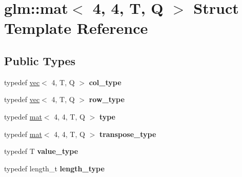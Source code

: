 \hypertarget{structglm_1_1mat_3_014_00_014_00_01T_00_01Q_01_4}{}\section{glm\+:\+:mat$<$ 4, 4, T, Q $>$ Struct Template Reference}
\label{structglm_1_1mat_3_014_00_014_00_01T_00_01Q_01_4}
\subsection*{Public Types}
\begin{DoxyCompactItemize}
\item 
\mbox{\label{structglm_1_1mat_3_014_00_014_00_01T_00_01Q_01_4_aad430dc291d0156d573c434be7fdecc1}} 
typedef \hyperlink{structglm_1_1vec}{vec}$<$ 4, T, Q $>$ {\bfseries col\+\_\+type}
\item 
\mbox{\label{structglm_1_1mat_3_014_00_014_00_01T_00_01Q_01_4_a2f05ded6544c98508d5f29e498d2e4dd}} 
typedef \hyperlink{structglm_1_1vec}{vec}$<$ 4, T, Q $>$ {\bfseries row\+\_\+type}
\item 
\mbox{\label{structglm_1_1mat_3_014_00_014_00_01T_00_01Q_01_4_a2151b2f14fc2ccf6e39a0ca3182270c2}} 
typedef \hyperlink{structglm_1_1mat}{mat}$<$ 4, 4, T, Q $>$ {\bfseries type}
\item 
\mbox{\label{structglm_1_1mat_3_014_00_014_00_01T_00_01Q_01_4_aae643ca23a5e538e908086e5149f500f}} 
typedef \hyperlink{structglm_1_1mat}{mat}$<$ 4, 4, T, Q $>$ {\bfseries transpose\+\_\+type}
\item 
\mbox{\label{structglm_1_1mat_3_014_00_014_00_01T_00_01Q_01_4_ae564877d4d3802415244ba1c83cc4c89}} 
typedef T {\bfseries value\+\_\+type}
\item 
\mbox{\label{structglm_1_1mat_3_014_00_014_00_01T_00_01Q_01_4_ae06c2957874bbff5701b304668b5cb01}} 
typedef length\+\_\+t {\bfseries length\+\_\+type}
\end{DoxyCompactItemize}
